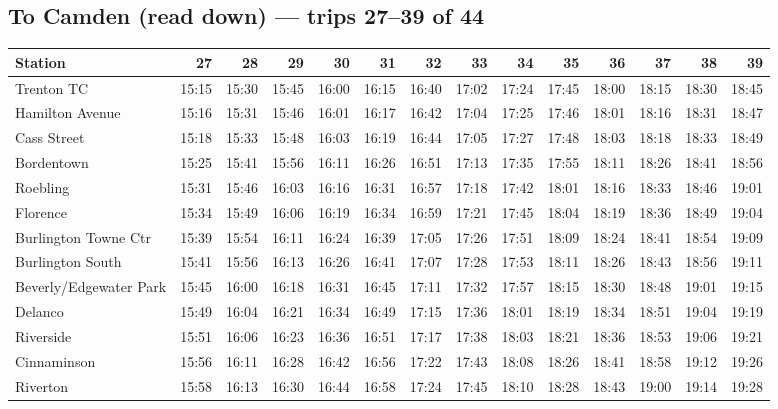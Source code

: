 \subsection*{To Camden (read down) --- trips 27--39 of 44}
\begin{center}\footnotesize\setlength{\tabcolsep}{3pt}\begin{tabular}{@{}lrrrrrrrrrrrrr@{}}\toprule
Station & 27 & 28 & 29 & 30 & 31 & 32 & 33 & 34 & 35 & 36 & 37 & 38 & 39 \\\midrule
Trenton TC & 15:15 & 15:30 & 15:45 & 16:00 & 16:15 & 16:40 & 17:02 & 17:24 & 17:45 & 18:00 & 18:15 & 18:30 & 18:45 \\
Hamilton Avenue & 15:16 & 15:31 & 15:46 & 16:01 & 16:17 & 16:42 & 17:04 & 17:25 & 17:46 & 18:01 & 18:16 & 18:31 & 18:47 \\
Cass Street & 15:18 & 15:33 & 15:48 & 16:03 & 16:19 & 16:44 & 17:05 & 17:27 & 17:48 & 18:03 & 18:18 & 18:33 & 18:49 \\
Bordentown & 15:25 & 15:41 & 15:56 & 16:11 & 16:26 & 16:51 & 17:13 & 17:35 & 17:55 & 18:11 & 18:26 & 18:41 & 18:56 \\
Roebling & 15:31 & 15:46 & 16:03 & 16:16 & 16:31 & 16:57 & 17:18 & 17:42 & 18:01 & 18:16 & 18:33 & 18:46 & 19:01 \\
Florence & 15:34 & 15:49 & 16:06 & 16:19 & 16:34 & 16:59 & 17:21 & 17:45 & 18:04 & 18:19 & 18:36 & 18:49 & 19:04 \\
Burlington Towne Ctr & 15:39 & 15:54 & 16:11 & 16:24 & 16:39 & 17:05 & 17:26 & 17:51 & 18:09 & 18:24 & 18:41 & 18:54 & 19:09 \\
Burlington South & 15:41 & 15:56 & 16:13 & 16:26 & 16:41 & 17:07 & 17:28 & 17:53 & 18:11 & 18:26 & 18:43 & 18:56 & 19:11 \\
Beverly/Edgewater Park & 15:45 & 16:00 & 16:18 & 16:31 & 16:45 & 17:11 & 17:32 & 17:57 & 18:15 & 18:30 & 18:48 & 19:01 & 19:15 \\
Delanco & 15:49 & 16:04 & 16:21 & 16:34 & 16:49 & 17:15 & 17:36 & 18:01 & 18:19 & 18:34 & 18:51 & 19:04 & 19:19 \\
Riverside & 15:51 & 16:06 & 16:23 & 16:36 & 16:51 & 17:17 & 17:38 & 18:03 & 18:21 & 18:36 & 18:53 & 19:06 & 19:21 \\
Cinnaminson & 15:56 & 16:11 & 16:28 & 16:42 & 16:56 & 17:22 & 17:43 & 18:08 & 18:26 & 18:41 & 18:58 & 19:12 & 19:26 \\
Riverton & 15:58 & 16:13 & 16:30 & 16:44 & 16:58 & 17:24 & 17:45 & 18:10 & 18:28 & 18:43 & 19:00 & 19:14 & 19:28 \\

\end{tabular}
\end{center}
